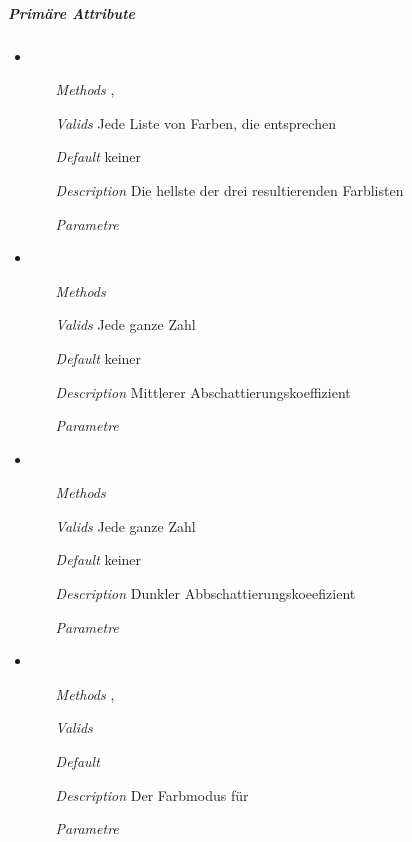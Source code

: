 \subparagraph{Prim\"are Attribute}
\begin{itemize}
\item {}
\begin{enumerate}
\item[\textit{Methods}] , 
\item[\textit{Valids}] Jede Liste von Farben, die 
 entsprechen
\item[\textit{Default}] keiner
\item[\textit{Description}] Die hellste der drei resultierenden
Farblisten
\item[\textit{Parametre}] 
\end{enumerate}

\item {}
\begin{enumerate}
\item[\textit{Methods}] 
\item[\textit{Valids}] Jede ganze Zahl
\item[\textit{Default}] keiner
\item[\textit{Description}] Mittlerer Abschattierungskoeffizient
\item[\textit{Parametre}] 
\end{enumerate}

\item {}
\begin{enumerate}
\item[\textit{Methods}] 
\item[\textit{Valids}] Jede ganze Zahl
\item[\textit{Default}] keiner
\item[\textit{Description}] Dunkler Abbschattierungskoeefizient
\item[\textit{Parametre}] 
\end{enumerate}

\item {}
\begin{enumerate}
\item[\textit{Methods}] , 
\item[\textit{Valids}] 
\item[\textit{Default}] 
\item[\textit{Description}] Der Farbmodus f\"ur 
\item[\textit{Parametre}] 
\end{enumerate}

\end{itemize}

